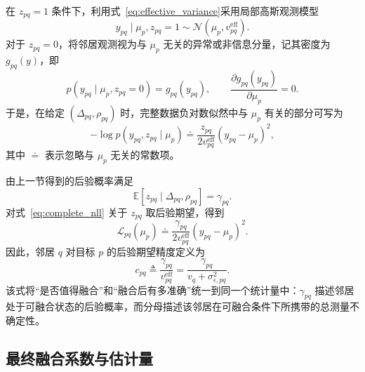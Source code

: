 \documentclass[11pt,a4paper]{ctexart}
\numberwithin{equation}{section}
\newcommand{\E}{\mathbb{E}}
\newcommand{\N}{\mathcal{N}}
\begin{document}
在 $z_{pq}=1$ 条件下，利用式~\eqref{eq:effective_variance}采用局部高斯观测模型
\begin{equation}
    y_{pq}\mid\mu_p,z_{pq}=1
    \sim
    \N\!\left(\mu_p,v_{pq}^{\mathrm{eff}}\right).
    \label{eq:y_gaussian}
\end{equation}
对于 $z_{pq}=0$，将邻居观测视为与 $\mu_p$ 无关的异常或非信息分量，记其密度为 $g_{pq}(y)$，即
\begin{equation}
    p(y_{pq}\mid\mu_p,z_{pq}=0)
    =
    g_{pq}(y_{pq}),
    \qquad
    \frac{\partial g_{pq}(y_{pq})}{\partial\mu_p}=0.
    \label{eq:outlier_model}
\end{equation}
于是，在给定 $(\Delta_{pq},\rho_{pq})$ 时，完整数据负对数似然中与 $\mu_p$ 有关的部分可写为
\begin{equation}
    -\log p(y_{pq},z_{pq}\mid\mu_p)
    \doteq
    \frac{z_{pq}}{2v_{pq}^{\mathrm{eff}}}
    (y_{pq}-\mu_p)^2,
    \label{eq:complete_nll}
\end{equation}
其中 $\doteq$ 表示忽略与 $\mu_p$ 无关的常数项。

由上一节得到的后验概率满足
\begin{equation}
    \E[z_{pq}\mid\Delta_{pq},\rho_{pq}]
    =
    \gamma_{pq}.
    \label{eq:ez_gamma}
\end{equation}
对式~\eqref{eq:complete_nll} 关于 $z_{pq}$ 取后验期望，得到
\begin{equation}
    \mathcal L_{pq}(\mu_p)
    \doteq
    \frac{\gamma_{pq}}
    {2v_{pq}^{\mathrm{eff}}}
    (y_{pq}-\mu_p)^2.
    \label{eq:expected_loss}
\end{equation}
因此，邻居 $q$ 对目标 $p$ 的后验期望精度定义为
\begin{equation}
    \boxed{
    c_{pq}
    \triangleq
    \frac{\gamma_{pq}}
    {v_{pq}^{\mathrm{eff}}}
    =
    \frac{\gamma_{pq}}
    {v_q+\sigma_{\epsilon,pq}^{2}}
    }.
    \label{eq:final_c}
\end{equation}
该式将``是否值得融合''和``融合后有多准确''统一到同一个统计量中：$\gamma_{pq}$ 描述邻居处于可融合状态的后验概率，而分母描述该邻居在可融合条件下所携带的总测量不确定性。

\subsection{最终融合系数与估计量}
\end{document}
